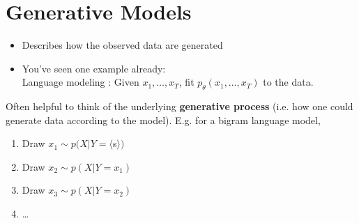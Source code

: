 
\section{Generative Models}

\begin{frame}
  \begin{center}
   \end{center} 
   \begin{itemize}   
   \item Describes how the observed data are generated
   \item You've seen one example already: \\
  Language modeling : Given $x_1, \dots, x_T$, fit $p_\theta(x_1, \dots, x_T)$ to the data.
   \end{itemize}
\end{frame}

\begin{frame}
  \begin{center}
   \end{center}
Often helpful to think of the underlying \textbf{generative process} (i.e. how one could generate data according to the model). E.g. for a bigram language model,
\begin{enumerate}
\item Draw $x_1 \sim p(X | Y = \langle$s$\rangle)$
\item Draw $x_2 \sim p(X| Y = x_1)$
\item Draw $x_3 \sim p(X| Y = x_2)$
\item \dots
\end{enumerate}

\end{frame}


